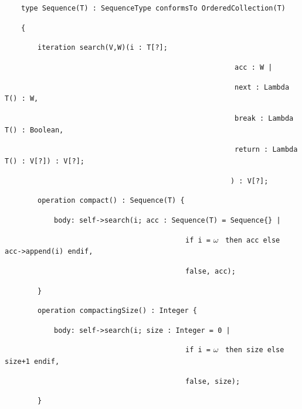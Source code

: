 \documentclass[
]{ceurart}
\begin{document}
\begin{description}[itemsep=-0.2cm]\small\begin{samepage}
\item ~~~~\verb!type Sequence(T) : SequenceType conformsTo OrderedCollection(T)!
\item ~~~~\verb!{!
\item ~~~~~~~~\verb!iteration search(V,W)(i : T[?]; !
\item ~~~~~~~~~~~~~~~~~~~~~~~~~~~~~~~~~~~~~~~~~~~~~~~~~~~~~~~~\verb!acc : W |!
\item ~~~~~~~~~~~~~~~~~~~~~~~~~~~~~~~~~~~~~~~~~~~~~~~~~~~~~~~~\verb!next : Lambda T() : W,!
\item ~~~~~~~~~~~~~~~~~~~~~~~~~~~~~~~~~~~~~~~~~~~~~~~~~~~~~~~~\verb!break : Lambda T() : Boolean,!
\item ~~~~~~~~~~~~~~~~~~~~~~~~~~~~~~~~~~~~~~~~~~~~~~~~~~~~~~~~\verb!return : Lambda T() : V[?]) : V[?];!
\item ~~~~~~~~~~~~~~~~~~~~~~~~~~~~~~~~~~~~~~~~~~~~~~~~~~~~~~~\verb!) : V[?];!
\end{samepage}\end{description}
\begin{description}[itemsep=-0.2cm]\small\begin{samepage}
\item ~~~~~~~~\verb!operation compact() : Sequence(T) {!
\item ~~~~~~~~~~~~\verb!body: self->search(i; acc : Sequence(T) = Sequence{} |!
\item ~~~~~~~~~~~~~~~~~~~~~~~~~~~~~~~~~~~~~~~~~~~~\verb!if i =! $\omega$ \verb! then acc else acc->append(i) endif,!
\item ~~~~~~~~~~~~~~~~~~~~~~~~~~~~~~~~~~~~~~~~~~~~\verb!false, acc);!
\item ~~~~~~~~\verb!}!
\end{samepage}\end{description}
\begin{description}[itemsep=-0.2cm]\small\begin{samepage}
\item ~~~~~~~~\verb!operation compactingSize() : Integer {!
\item ~~~~~~~~~~~~\verb!body: self->search(i; size : Integer = 0 |!
\item ~~~~~~~~~~~~~~~~~~~~~~~~~~~~~~~~~~~~~~~~~~~~\verb!if i =! $\omega$ \verb! then size else size+1 endif,!
\item ~~~~~~~~~~~~~~~~~~~~~~~~~~~~~~~~~~~~~~~~~~~~\verb!false, size);!
\item ~~~~~~~~\verb!}!\end{samepage}\end{description}
\end{document}
